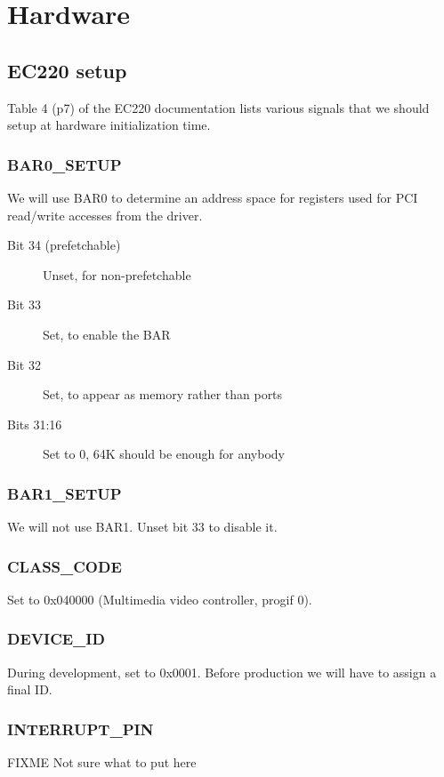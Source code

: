 \documentclass[12pt]{article}
\begin{document}
\section{Hardware}

\subsection{EC220 setup}

Table 4 (p7) of the EC220 documentation lists various signals that we should setup at hardware initialization time.

\subsubsection{BAR0\_SETUP}
We will use BAR0 to determine an address space for registers used for PCI read/write accesses from the driver.

\begin{description}
\item[Bit 34 (prefetchable)] Unset, for non-prefetchable
\item[Bit 33] Set, to enable the BAR
\item[Bit 32] Set, to appear as memory rather than ports
\item[Bits 31:16] Set to 0, 64K should be enough for anybody
\end{description}

\subsubsection{BAR1\_SETUP}
We will not use BAR1. Unset bit 33 to disable it.

\subsubsection{CLASS\_CODE}
Set to 0x040000 (Multimedia video controller, progif 0).

\subsubsection{DEVICE\_ID}
During development, set to 0x0001. Before production we will have to assign a final ID.

\subsubsection{INTERRUPT\_PIN}
FIXME Not sure what to put here
\end{document}

